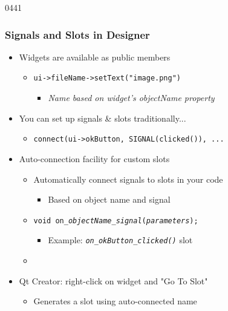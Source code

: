 \begin{slide}{0441}
\frametitle{Signals and Slots in Designer}
  \begin{itemize}
  \item Widgets are available as public members
    \begin{itemize}
    \item \texttt{ui->fileName->setText("image.png")}
      \begin{itemize}
      \item \textit{Name based on widget's objectName property}
      \end{itemize}
    \end{itemize}
  \item You can set up signals \& slots traditionally...
    \begin{itemize}
    \item \texttt{connect(ui->okButton, SIGNAL(clicked()), ...}
    \end{itemize}
  \end{itemize}
  \begin{itemize}
  \item Auto-connection facility for custom slots
    \begin{itemize}
    \item Automatically connect signals to slots in your code
      \begin{itemize}
      \item Based on object name and signal 
      \end{itemize}
    \item \texttt{void on\_\emph{objectName}\_\emph{signal}(\emph{parameters});}
      \begin{itemize}
      \item Example: \textit{\texttt{on\_okButton\_clicked()}} slot
      \end{itemize}
    \item {}
    \end{itemize}
  \end{itemize}
  \begin{itemize}
  \item Qt Creator: right-click on widget and "Go To Slot"
    \begin{itemize}
    \item Generates a slot using auto-connected name
    \end{itemize}
  \end{itemize}

\end{slide}


